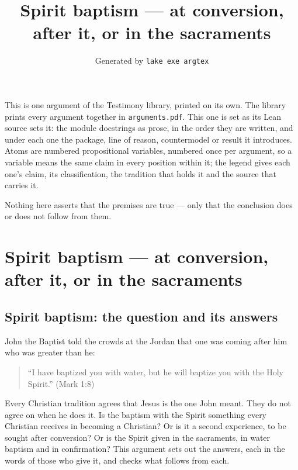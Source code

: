 \documentclass[11pt]{article}
\title{Spirit baptism — at conversion, after it, or in the sacraments}
\author{\credit{TestimonyArguments.SpiritBaptism}}
\date{Generated by \texttt{lake exe argtex}}
\begin{document}
\maketitle
\noindent This is one argument of the Testimony library, printed on its own. The library prints every argument together in \texttt{arguments.pdf}. This one is set as its Lean source sets it: the module docstrings as prose, in the order they are written, and under each one the package, line of reason, countermodel or result it introduces. Atoms are numbered propositional variables, numbered once per argument, so a variable means the same claim in every position within it; the legend gives each one's claim, its classification, the tradition that holds it and the source that carries it.

\noindent Nothing here asserts that the premises are true --- only that the conclusion does or does not follow from them.

\tableofcontents
\clearpage
\section*{Spirit baptism — at conversion, after it, or in the sacraments}

\subsection*{Spirit baptism: the question and its answers}
John the Baptist told the crowds at the Jordan that one was coming after him who was greater than he:

\begin{quote}
“I have baptized you with water, but he will baptize you with the Holy Spirit.” (Mark 1:8)

\end{quote}
Every Christian tradition agrees that Jesus is the one John meant. They do not agree on when he does it. Is the baptism with the Spirit something every Christian receives in becoming a Christian? Or is it a second experience, to be sought after conversion? Or is the Spirit given in the sacraments, in water baptism and in confirmation? This argument sets out the answers, each in the words of those who give it, and checks what follows from each.
\end{document}
